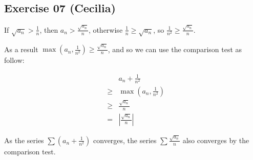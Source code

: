 \subsection*{Exercise 07 (Cecilia)}

If $ \sqrt{a_n} > \frac{1}{n} $, then $ a_n > \frac{\sqrt{a_n}}{n} $, otherwise $ \frac{1}{n} \ge \sqrt{a_n} $, so $ \frac{1}{n^2} \ge \frac{\sqrt{a_n}}{n} $.

As a result $ \max\left(a_n, \frac{1}{n^2}\right) \ge \frac{\sqrt{a_n}}{n} $, and so we can use the comparison test as follow:

\begin{eqnarray*}
  &   & a_n + \frac{1}{n^2} \\
  &\ge& \max\left(a_n, \frac{1}{n^2}\right) \\
  &\ge& \frac{\sqrt{a_n}}{n} \\
  & = & \left|\frac{\sqrt{a_n}}{n}\right|
\end{eqnarray*}

As the series $ \sum (a_n + \frac{1}{n^2}) $ converges, the series $ \sum \frac{\sqrt{a_n}}{n} $ also converges by the comparison test.
